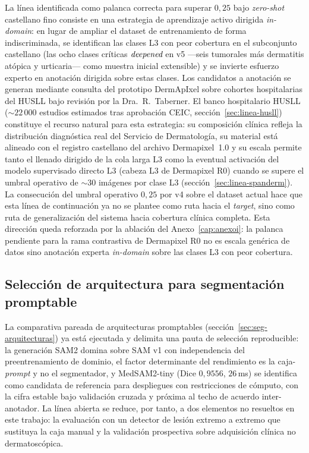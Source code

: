 La línea identificada como palanca correcta para superar
$0{,}25$ bajo \emph{zero-shot} castellano fino consiste en una
estrategia de aprendizaje activo dirigida \emph{in-domain}: en
lugar de ampliar el dataset de entrenamiento de forma
indiscriminada, se identifican las clases L3 con peor cobertura
en el subconjunto castellano (las ocho clases críticas
$\emph{deepened}$ en v5 ---seis tumorales más dermatitis atópica
y urticaria--- como muestra inicial extensible) y se invierte
esfuerzo experto en anotación dirigida sobre estas clases. Los
candidatos a anotación se generan mediante consulta del
prototipo DermApIxel sobre cohortes hospitalarias del HUSLL bajo
revisión por la Dra.~R.~Taberner. El banco hospitalario HUSLL
($\sim 22\,000$ estudios estimados tras aprobación CEIC,
sección~\ref{sec:linea-husll}) constituye el recurso natural
para esta estrategia: su composición clínica refleja la
distribución diagnóstica real del Servicio de Dermatología, su
material está alineado con el registro castellano del archivo
Dermapixel~1.0 y su escala permite tanto el llenado dirigido de
la cola larga L3 como la eventual activación del modelo
supervisado directo L3 (cabeza L3 de Dermapixel R0) cuando se supere el umbral
operativo de $\sim 30$ imágenes por clase L3
(sección~\ref{sec:linea-spanderm}). La consecución del umbral
operativo $0{,}25$ por v4 sobre el dataset actual hace que esta
línea de continuación ya no se plantee como ruta hacia el
\emph{target}, sino como ruta de generalización del sistema
hacia cobertura clínica completa. Esta dirección queda reforzada
por la ablación del Anexo~\ref{cap:anexoi}: la palanca pendiente
para la rama contrastiva de Dermapixel R0 no es escala genérica de datos sino anotación
experta \emph{in-domain} sobre las clases L3 con peor cobertura.

\subsection{Selección de arquitectura para segmentación promptable}
\label{sec:linea-seg-arquitectura}

La comparativa pareada de arquitecturas promptables
(sección~\ref{sec:seg-arquitecturas}) ya está ejecutada y delimita una
pauta de selección reproducible: la generación SAM2 domina sobre SAM
v1 con independencia del preentrenamiento de dominio, el factor
determinante del rendimiento es la caja-\emph{prompt} y no el
segmentador, y MedSAM2-tiny (Dice $0{,}9556$, $26$\,ms) se identifica
como candidata de referencia para despliegues con restricciones de
cómputo, con la cifra estable bajo validación cruzada y próxima al
techo de acuerdo inter-anotador. La línea abierta se reduce, por
tanto, a dos elementos no resueltos en este trabajo: la evaluación con
un detector de lesión extremo a extremo que sustituya la caja manual y
la validación prospectiva sobre adquisición clínica no dermatoscópica.

